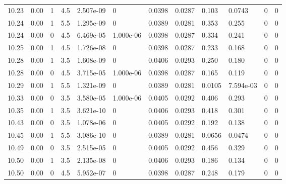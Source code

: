 \documentclass[preview]{standalone}
\begin{document}
{{{{{{{\begin{tabular}{L{1.2cm}C{1.2cm} C{0.3cm}C{0.5cm} C{1.4cm}C{1.4cm} C{1.4cm}C{1.4cm} C{1.6cm}C{1.6cm} C{1.6cm}C{1.6cm}}
  10.23  &  0.00  & 1     & 4.5 &  2.507e-09  & 0  &  0.0398&   0.0287& 0.103 & 0.0743   &  0 & 0  \\ 
  10.24  &  0.00  & 1     & 5.5 &  1.295e-09  & 0  &  0.0389&   0.0281& 0.353 & 0.255   &  0 & 0  \\ 
  10.24  &  0.00  & 0     & 4.5 &  6.469e-05  & 1.000e-06  &  0.0398&   0.0287& 0.334 & 0.241   &  0 & 0  \\ 
  10.25  &  0.00  & 1     & 4.5 &  1.726e-08  & 0  &  0.0398&   0.0287& 0.233 & 0.168   &  0 & 0  \\ 
  10.28  &  0.00  & 1     & 3.5 &  1.608e-09  & 0  &  0.0406&   0.0293& 0.250 & 0.180   &  0 & 0  \\ 
  10.28  &  0.00  & 0     & 4.5 &  3.715e-05  & 1.000e-06  &  0.0398&   0.0287& 0.165 & 0.119   &  0 & 0  \\ 
  10.29  &  0.00  & 1     & 5.5 &  1.321e-09  & 0  &  0.0389&   0.0281& 0.0105 & 7.594e-03   &  0 & 0  \\ 
  10.33  &  0.00  & 0     & 3.5 &  3.580e-05  & 1.000e-06  &  0.0405&   0.0292& 0.406 & 0.293   &  0 & 0  \\ 
  10.35  &  0.00  & 1     & 3.5 &  3.621e-10  & 0  &  0.0406&   0.0293& 0.418 & 0.301   &  0 & 0  \\ 
  10.43  &  0.00  & 0     & 3.5 &  1.078e-06  & 0  &  0.0405&   0.0292& 0.192 & 0.138   &  0 & 0  \\ 
  10.45  &  0.00  & 1     & 5.5 &  3.086e-10  & 0  &  0.0389&   0.0281& 0.0656 & 0.0474   &  0 & 0  \\ 
  10.49  &  0.00  & 0     & 3.5 &  2.515e-05  & 0  &  0.0405&   0.0292& 0.456 & 0.329   &  0 & 0  \\ 
  10.50  &  0.00  & 1     & 3.5 &  2.135e-08  & 0  &  0.0406&   0.0293& 0.186 & 0.134   &  0 & 0  \\ 
  10.50  &  0.00  & 0     & 4.5 &  5.952e-07  & 0  &  0.0398&   0.0287& 0.248 & 0.179   &  0 & 0  \\ 
\hline 
\end{tabular} 

}}}}}}}
\end{document}
